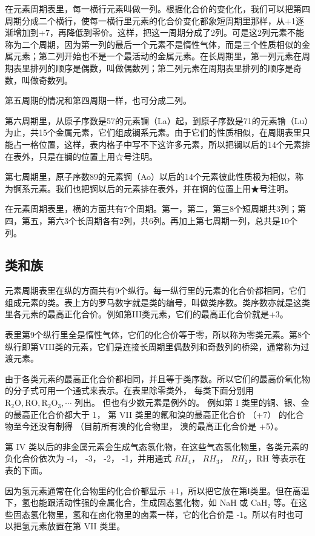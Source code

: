 在元素周期表里，每一横行元素叫做一列。根据化合价的变化化，我们可以把第四周期分成二个横行，使每一横行里元素的化合价变化都象短周期里那样，从+1逐渐增加到+7，再降低到零价。这样，把这一周期分成了2列。可是这2列元素不能称为二个周期，因为第一列的最后一个元素不是惰性气体，而是三个性质相似的金属元素；第二列开始也不是一个最活动的金属元素。在长周期里，第一列元素在周期表里排列的顺序是偶数，叫做偶数列；第二列元素在周期表里排列的顺序是奇数，叫做奇数列。

第五周期的情况和第四周期一样，也可分成二列。

第六周期里，从原子序数是57的元素镧（La）起，到原子序数是71的元素镥（Lu）为止，共15个金属元素，它们组成镧系元素。由于它们的性质相似，在周期表里只能占一格位置，这样，表内格子中写不下这许多元素，所以把镧以后的14个元素排在表外，只是在镧的位置上用☆号注明。

第七周期里，原子序数89的元素锕（Ao）以后的14个元素彼此性质极为相似，称为锕系元素。我们也把锕以后的元素排在表外，并在锕的位置上用★号注明。

在元素周期表里，横的方面共有7个周期。第一，第二，第三8个短周期共3列；第四，第五，第六3个长周期各有2列，共6列。再加上第七周期一列，总共是10个列。

\subsection{类和族}

元素周期表里在纵的方面共有9个纵行。每一纵行里的元素的化合价都相同，它们组成元素的类。表上方的罗马数字就是类的编号，叫做类序数。类序数亦就是这类里各元素的最高正化合价。例如第III类元素，它们的最高正化合价就是+3。

表里第9个纵行里全是惰性气体，它们的化合价等于零，所以称为零类元素。第8个纵行即第VIII类的元素，它们是连接长周期里偶数列和奇数列的桥梁，通常称为过渡元素。

由于各类元素的最高正化合价都相同，并且等于类序数。所以它们的最高价氧化物的分子式可用一个通式来表示。在表里除零类外，
每类下面分别用
\(\mathrm{R}_{2} \mathrm{O}, \mathrm{RO}, \mathrm{R}_{2} \mathrm{O}_{3}, \cdots\)
列出。 但也有少数元素是例外的。 例如第 I
类里的铜、银、金的最高正化合价都大于 1， 第 VII
类里的氟和溴的最高正化合价 （+7） 的化合物至今还没有制得
（目前所有溴的化合物里， 溴的最高正化合价是 +5）。

第 IV
类以后的非金属元素会生成气态氢化物，在这些气态氢化物里，各类元素的负化合价依次为
-4， -3， -2， -1，并用通式 \(RH_{4}\)， \(RH_{3}\)， \(RH_{2}\)，RH
等表示在表的下面。

因为氢元素通常在化合物里的化合价都显示
+1，所以把它放在第Ⅰ类里。但在高温下，氢也能跟活动性强的金属化合，生成固态氢化物，如
NaH 或 CaH₂
等。在这些固态氢化物里，氢和在卤化物里的卤素一样，它的化合价是
-1。所以有时也可以把氢元素放置在第 VII 类里。

